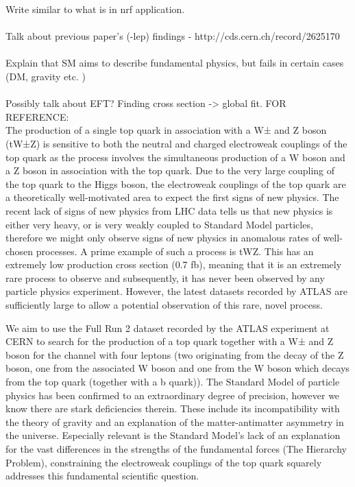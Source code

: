  
Write similar to what is in nrf application. \\\\
Talk about previous paper's (-lep) findings - http://cds.cern.ch/record/2625170\\\\
Explain that SM aims to describe fundamental physics, but fails in certain cases (DM, gravity etc. )\\\\
Possibly talk about EFT? Finding \tWZ cross section -> global fit.
FOR REFERENCE:\\
The production of a single top quark in association with a W± and Z boson (tW±Z) is sensitive to both the neutral and charged electroweak couplings of the top quark as the process involves the simultaneous production of a W boson and a Z boson in association with the top quark. Due to the very large coupling of the top quark to the Higgs boson, the electroweak couplings of the top quark are a theoretically well-motivated area to expect the first signs of new physics. The recent lack of signs of new physics from LHC data tells us that new physics is either very heavy, or is very weakly coupled to Standard Model particles, therefore we might only observe signs of new physics in anomalous rates of well-chosen processes. A prime example of such a process is tWZ. This has an extremely low production cross section (0.7 fb), meaning that it is an extremely rare process to observe and subsequently, it has never been observed by any particle physics experiment. However, the latest datasets recorded by ATLAS are sufficiently large to allow a potential observation of this rare, novel process. 

We aim to use the Full Run 2 dataset recorded by the ATLAS experiment at CERN to search for the production of a top quark together with a W± and Z boson for the channel with four leptons (two originating from the decay of the Z boson, one from the associated W boson and one from the W boson which decays from the top quark (together with a b quark)). The Standard Model of particle physics has been confirmed to an extraordinary degree of precision, however we know there are stark deficiencies therein. These include its incompatibility with the theory of gravity and an explanation of the matter-antimatter asymmetry in the universe. Especially relevant is the Standard Model's lack of an explanation for the vast differences in the strengths of the fundamental forces (The Hierarchy Problem), constraining the electroweak couplings of the top quark squarely addresses this fundamental scientific question.